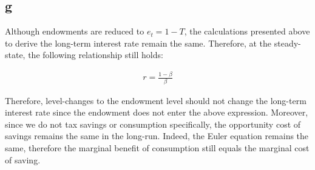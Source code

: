 \documentclass{article}
\begin{document}
\subsection{g}

Although endowments are reduced to $e_t = 1-T$, the calculations presented above to derive the long-term interest rate remain the same. Therefore, at the steady-state, the following relationship still holds: 

\begin{gather*}
    r = \frac{1-\beta}{\beta}
\end{gather*}

Therefore, level-changes to the endowment level should not change the long-term interest rate since the endowment does not enter the above expression. Moreover, since we do not tax savings or consumption specifically, the opportunity cost of savings remains the same in the long-run. Indeed, the Euler equation remains the same, therefore the marginal benefit of consumption still equals the marginal cost of saving. 
\end{document}
